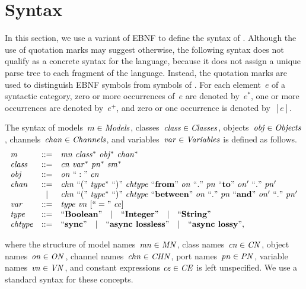 \section{Syntax}

In this section, we use a variant of EBNF to define the syntax of \SLCO.
Although the use of quotation marks may suggest otherwise, the following syntax does not qualify as a concrete syntax for the language, because it does not assign a unique parse tree to each fragment of the language.
Instead, the quotation marks are used to distinguish EBNF symbols from symbols of \SLCO.
For each element~$e$ of a syntactic category, zero or more occurrences of~$e$ are denoted by~$e^*$, one or more occurrences are denoted by~$e^+$, and zero or one occurrence is denoted by~$[e]$.

The syntax of models~$m \in \it Models$, classes~$\it{class} \in \it Classes$, objects~$\it{obj} \in \it Objects$, channels~$\it{chan} \in \it Channels$, and variables~$\it{var} \in Variables$ is defined as follows.
%
\[
\begin{array}{lcl}
\it{m} & ::= & \it{mn}~\it{class^*}~\it{obj^*}~\it{chan^*} \\
\it{class} & ::= & \it{cn}~\it{var^*}~\it{pn^*}~\it{sm^*} \\
\it{obj} & ::= & \it{on}~``:"~\it{cn} \\
\it{chan} & ::= & \it{chn}~``("~\it{type^*}~``)"~\it{chtype}~``\textbf{from}"~\it{on}~``."~\it{pn}~``\textbf{to}"~\it{on'}~``."~\it{pn'} \\
& | & \it{chn}~``("~\it{type^*}~``)"~\it{chtype}~``\textbf{between}"~\it{on}~``."~\it{pn}~``\textbf{and}"~\it{on'}~``."~\it{pn'} \\
\it{var} & ::= & \it{type}~\it{vn}~[``="~\it{ce}] \\
\it{type} & ::= & ``\textbf{Boolean}" \quad | \quad ``\textbf{Integer}" \quad | \quad ``\textbf{String}" \\
\it{chtype} & ::= & ``\textbf{sync}" \quad | \quad ``\textbf{async lossless}" \quad | \quad ``\textbf{async lossy}",
\end{array}
\]

\noindent
where the structure of model names~$\it{mn} \in \it MN$, class names~$\it{cn} \in \it CN$, object names~$\it{on} \in \it ON$, channel names~$\it{chn} \in \it CHN$, port names~$\it{pn} \in \it PN$, variable names~$\it{vn} \in \it VN$, and constant expressions $\it{ce} \in \it CE$ is left unspecified.
We use a standard syntax for these concepts.

